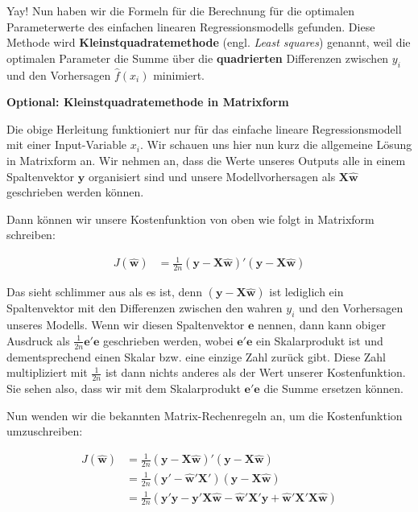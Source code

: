 \documentclass[
]{book}
\begin{document}
Yay! Nun haben wir die Formeln für die Berechnung für die optimalen Parameterwerte des einfachen linearen Regressionsmodells gefunden. Diese Methode wird \textbf{Kleinstquadratemethode} (engl. \emph{Least squares}) genannt, weil die optimalen Parameter die Summe über die \textbf{quadrierten} Differenzen zwischen \(y_i\) und den Vorhersagen \(\hat{f}(x_i)\) minimiert.

\textbf{Optional: Kleinstquadratemethode in Matrixform}

Die obige Herleitung funktioniert nur für das einfache lineare Regressionsmodell mit einer Input-Variable \(x_i\). Wir schauen uns hier nun kurz die allgemeine Lösung in Matrixform an. Wir nehmen an, dass die Werte unseres Outputs alle in einem Spaltenvektor \(\mathbf{y}\) organisiert sind und unsere Modellvorhersagen als \(\mathbf{X}\mathbf{\hat{w}}\) geschrieben werden können.

Dann können wir unsere Kostenfunktion von oben wie folgt in Matrixform schreiben:

\begin{align}
J(\mathbf{\hat{w}}) &= \frac{1}{2n} (\mathbf{y} - \mathbf{X}\mathbf{\hat{w}})' (\mathbf{y} - \mathbf{X}\mathbf{\hat{w}})
\end{align}

Das sieht schlimmer aus als es ist, denn \((\mathbf{y} - \mathbf{X}\mathbf{\hat{w}})\) ist lediglich ein Spaltenvektor mit den Differenzen zwischen den wahren \(y_i\) und den Vorhersagen unseres Modells. Wenn wir diesen Spaltenvektor \(\mathbf{e}\) nennen, dann kann obiger Ausdruck als \(\frac{1}{2n} \mathbf{e}'\mathbf{e}\) geschrieben werden, wobei \(\mathbf{e}'\mathbf{e}\) ein Skalarprodukt ist und dementsprechend einen Skalar bzw. eine einzige Zahl zurück gibt. Diese Zahl multipliziert mit \(\frac{1}{2n}\) ist dann nichts anderes als der Wert unserer Kostenfunktion. Sie sehen also, dass wir mit dem Skalarprodukt \(\mathbf{e}'\mathbf{e}\) die Summe ersetzen können.

Nun wenden wir die bekannten Matrix-Rechenregeln an, um die Kostenfunktion umzuschreiben:

\begin{align}
J(\mathbf{\hat{w}}) &= \frac{1}{2n} (\mathbf{y} - \mathbf{X}\mathbf{\hat{w}})' (\mathbf{y} - \mathbf{X}\mathbf{\hat{w}}) \\
&= \frac{1}{2n} (\mathbf{y}' - \mathbf{\hat{w}}' \mathbf{X}') (\mathbf{y} - \mathbf{X}\mathbf{\hat{w}}) \\
&= \frac{1}{2n} (\mathbf{y}'\mathbf{y} - \mathbf{y}'\mathbf{X}\mathbf{\hat{w}} - \mathbf{\hat{w}}' \mathbf{X}'\mathbf{y} + \mathbf{\hat{w}}' \mathbf{X}'\mathbf{X}\mathbf{\hat{w}})
\end{align}
\end{document}

